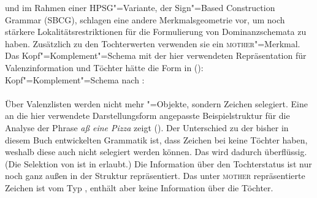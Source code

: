 \mbox{}\citet*[475--489]{SWB2003a} und \citet{Sag2007a,Sag2012a} im Rahmen einer HPSG"=Variante, der
Sign"=Based
Construction Grammar (SBCG), schlagen eine andere Merkmalsgeometrie vor, um noch
stärkere
Lokalitätsrestriktionen für die Formulierung von Dominanzschemata zu haben. Zusätzlich zu den Tochterwerten
verwenden sie ein \textsc{mother}"=Merkmal. Das Kopf"=Komplement"=Schema mit der hier
verwendeten Repräsentation für Valenzinformation und Töchter hätte die Form in ():
\ea
Kopf"=Komplement"=Schema nach \citet*[481]{SWB2003a}:\\
 \impl\\
\z
Über Valenzlisten werden nicht mehr "=Objekte, sondern Zeichen selegiert. Eine an die hier verwendete
Darstellungsform angepasste Beispielstruktur für die Analyse der Phrase \emph{aß eine Pizza} zeigt
().
Der Unterschied zu der bisher in diesem Buch entwickelten Grammatik ist, 
dass Zeichen bei \citeauthor*{SWB2003a} keine Töchter haben, weshalb
diese auch nicht selegiert werden können. Das \synsemm wird dadurch überflüssig. (Die Selektion von
\phon ist in  erlaubt.) Die Information
über den Tochterstatus ist nur noch ganz außen in der Struktur repräsentiert. Das unter
\textsc{mother} repräsentierte Zeichen ist vom Typ , enthält aber keine Information
über die Töchter. 
\ea
\label{feat-geom-swb}
